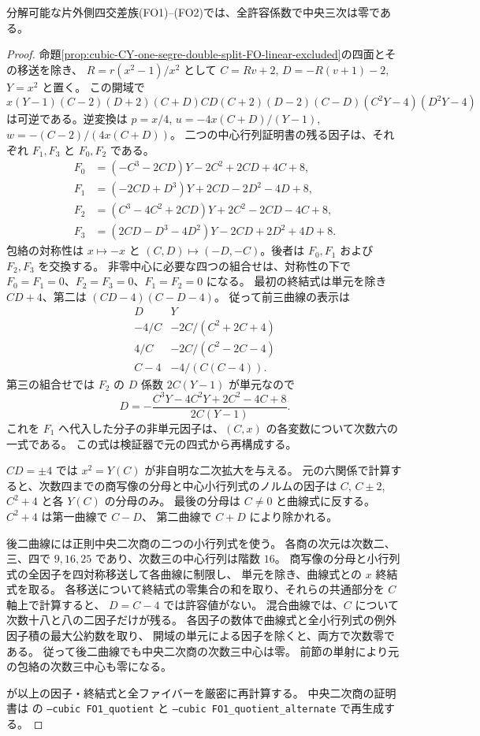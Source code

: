 \begin{proposition}\label{prop:cubic-CY-one-segre-double-split-FO-excluded}
分解可能な片外側四交差族(FO1)--(FO2)では、全許容係数で中央三次は零である。
\end{proposition}
\begin{proof}
命題\ref{prop:cubic-CY-one-segre-double-split-FO-linear-excluded}の四面とその移送を除き、
$R=r(x^2-1)/x^2$ として $C=Rv+2$, $D=-R(v+1)-2$, $Y=x^2$ と置く。
この開域で
\[
 x(Y-1)(C-2)(D+2)(C+D)CD(C+2)(D-2)(C-D)
 (C^2Y-4)(D^2Y-4)
\]
は可逆である。逆変換は
$p=x/4$, $u=-4x(C+D)/(Y-1)$, $w=-(C-2)/(4x(C+D))$。
二つの中心行列証明書の残る因子は、それぞれ $F_1,F_3$ と $F_0,F_2$ である。
\[
\begin{aligned}
 F_0&=(-C^3-2CD)Y-2C^2+2CD+4C+8,\\
 F_1&=(-2CD+D^3)Y+2CD-2D^2-4D+8,\\
 F_2&=(C^3-4C^2+2CD)Y+2C^2-2CD-4C+8,\\
 F_3&=(2CD-D^3-4D^2)Y-2CD+2D^2+4D+8 .
\end{aligned}
\]
包絡の対称性は $x\mapsto-x$ と $(C,D)\mapsto(-D,-C)$。後者は
$F_0,F_1$ および $F_2,F_3$ を交換する。
非零中心に必要な四つの組合せは、対称性の下で
$F_0=F_1=0$、$F_2=F_3=0$、$F_1=F_2=0$ になる。
最初の終結式は単元を除き $CD+4$、第二は $(CD-4)(C-D-4)$。
従って前三曲線の表示は
\[
\begin{array}{c|c}
 D&Y\\ \hline
 -4/C&-2C/(C^2+2C+4)\\
 4/C&-2C/(C^2-2C-4)\\
 C-4&-4/(C(C-4)).
\end{array}
\]
第三の組合せでは $F_2$ の $D$ 係数 $2C(Y-1)$ が単元なので
\[
 D=-\frac{C^3Y-4C^2Y+2C^2-4C+8}{2C(Y-1)} .
\]
これを $F_1$ へ代入した分子の非単元因子は、$(C,x)$ の各変数について次数六の一式である。
この式は検証器で元の四式から再構成する。

$CD=\pm4$ では $x^2=Y(C)$ が非自明な二次拡大を与える。
元の六関係で計算すると、次数四までの商写像の分母と中心小行列式のノルムの因子は
$C$, $C\pm2$, $C^2+4$ と各 $Y(C)$ の分母のみ。
最後の分母は $C\ne0$ と曲線式に反する。$C^2+4$ は第一曲線で $C-D$、
第二曲線で $C+D$ により除かれる。

後二曲線には正則中央二次商の二つの小行列式を使う。
各商の次元は次数二、三、四で $9,16,25$ であり、次数三の中心行列は階数 $16$。
商写像の分母と小行列式の全因子を四対称移送して各曲線に制限し、
単元を除き、曲線式との $x$ 終結式を取る。
各移送について終結式の零集合の和を取り、それらの共通部分を $C$ 軸上で計算すると、
$D=C-4$ では許容値がない。
混合曲線では、$C$ について次数十八と八の二因子だけが残る。
各因子の数体で曲線式と全小行列式の例外因子積の最大公約数を取り、
開域の単元による因子を除くと、両方で次数零である。
従って後二曲線でも中央二次商の次数三中心は零。
前節の単射により元の包絡の次数三中心も零になる。

 が以上の因子・終結式と全ファイバーを厳密に再計算する。
中央二次商の証明書は
 の
\texttt{--cubic FO1\_quotient} と \texttt{--cubic FO1\_quotient\_alternate} で再生成する。
\end{proof}

